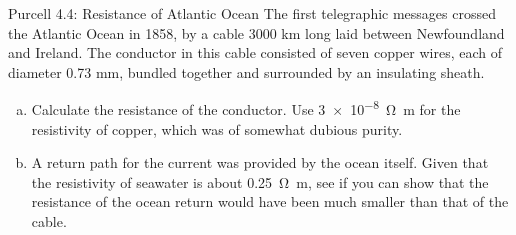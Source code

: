 \documentclass{esg8022pset}
\begin{document}
\begin{problem}{Purcell 4.4: Resistance of Atlantic Ocean}
  The first telegraphic messages crossed the Atlantic Ocean in 1858, by a cable 3000 km long laid between Newfoundland and Ireland. The conductor in this cable consisted of seven copper wires, each of diameter 0.73 mm, bundled together and surrounded by an insulating sheath.
  \begin{enumerate}[(a)]
    \item Calculate the resistance of the conductor. Use \SI{3e-8}{\ohm\meter} for the resistivity of copper, which was of somewhat dubious purity.
    \item A return path for the current was provided by the ocean itself. Given that the resistivity of seawater is about \SI{0.25}{\ohm\meter}, see if you can show that the resistance of the ocean return would have been much smaller than that of the cable.
  \end{enumerate}
\end{problem}
\begin{solution}

\end{solution}
\end{document}
